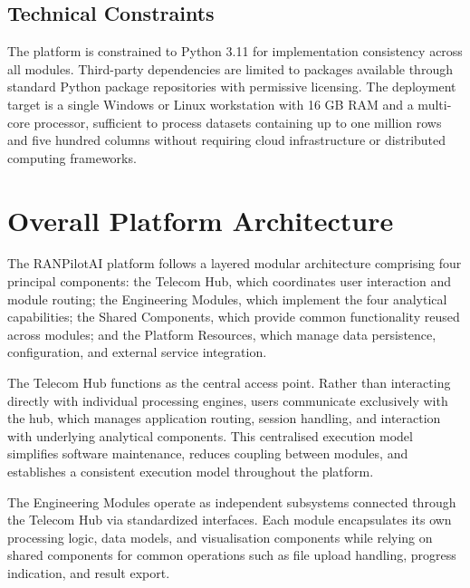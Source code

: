 \subsection{Technical Constraints}

The platform is constrained to Python 3.11 for implementation consistency across all modules. Third-party dependencies are limited to packages available through standard Python package repositories with permissive licensing. The deployment target is a single Windows or Linux workstation with 16 GB RAM and a multi-core processor, sufficient to process datasets containing up to one million rows and five hundred columns without requiring cloud infrastructure or distributed computing frameworks.

\section{Overall Platform Architecture}

The RANPilotAI platform follows a layered modular architecture comprising four principal components: the Telecom Hub, which coordinates user interaction and module routing; the Engineering Modules, which implement the four analytical capabilities; the Shared Components, which provide common functionality reused across modules; and the Platform Resources, which manage data persistence, configuration, and external service integration.

The Telecom Hub functions as the central access point. Rather than interacting directly with individual processing engines, users communicate exclusively with the hub, which manages application routing, session handling, and interaction with underlying analytical components. This centralised execution model simplifies software maintenance, reduces coupling between modules, and establishes a consistent execution model throughout the platform.

The Engineering Modules operate as independent subsystems connected through the Telecom Hub via standardized interfaces. Each module encapsulates its own processing logic, data models, and visualisation components while relying on shared components for common operations such as file upload handling, progress indication, and result export.

